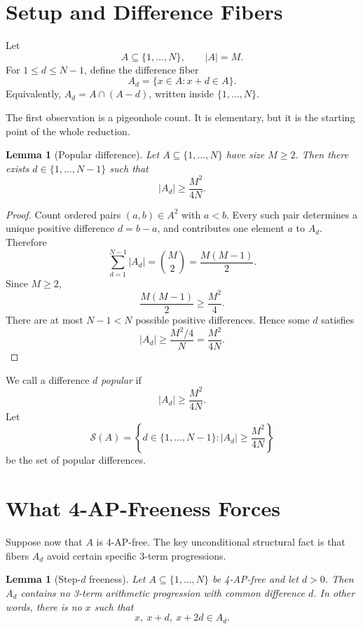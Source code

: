 \documentclass[11pt]{article}
\newtheorem{lemma}[theorem]{Lemma}
\newcommand{\calS}{\mathcal{S}}
\begin{document}
\section{Setup and Difference Fibers}

Let
\[
  A\subseteq\{1,\ldots,N\},\qquad |A|=M.
\]
For \(1\leq d\leq N-1\), define the difference fiber
\[
  A_d=\{x\in A:x+d\in A\}.
\]
Equivalently, \(A_d=A\cap(A-d)\), written inside \(\{1,\ldots,N\}\).

The first observation is a pigeonhole count.  It is elementary, but it is the
starting point of the whole reduction.

\begin{lemma}[Popular difference]
\label{lem:popular}
Let \(A\subseteq\{1,\ldots,N\}\) have size \(M\geq 2\).  Then there exists
\(d\in\{1,\ldots,N-1\}\) such that
\[
  |A_d|\geq \frac{M^2}{4N}.
\]
\end{lemma}

\begin{proof}
Count ordered pairs \((a,b)\in A^2\) with \(a<b\).  Every such pair determines a
unique positive difference \(d=b-a\), and contributes one element \(a\) to
\(A_d\).  Therefore
\[
  \sum_{d=1}^{N-1}|A_d|
  =
  \binom{M}{2}
  =
  \frac{M(M-1)}{2}.
\]
Since \(M\geq 2\),
\[
  \frac{M(M-1)}{2}\geq \frac{M^2}{4}.
\]
There are at most \(N-1<N\) possible positive differences.  Hence some \(d\)
satisfies
\[
  |A_d|
  \geq
  \frac{M^2/4}{N}
  =
  \frac{M^2}{4N}.
\]
\end{proof}

We call a difference \(d\) \emph{popular} if
\[
  |A_d|\geq \frac{M^2}{4N}.
\]
Let
\[
  \calS(A)=\left\{d\in\{1,\ldots,N-1\}: |A_d|\geq \frac{M^2}{4N}\right\}
\]
be the set of popular differences.

\section{What 4-AP-Freeness Forces}

Suppose now that \(A\) is 4-AP-free.  The key unconditional structural fact is
that fibers \(A_d\) avoid certain specific 3-term progressions.

\begin{lemma}[Step-\(d\) freeness]
\label{lem:stepd}
Let \(A\subseteq\{1,\ldots,N\}\) be 4-AP-free and let \(d>0\).  Then \(A_d\)
contains no 3-term arithmetic progression with common difference \(d\).  In
other words, there is no \(x\) such that
\[
  x,\ x+d,\ x+2d\in A_d.
\]
\end{lemma}
\end{document}
